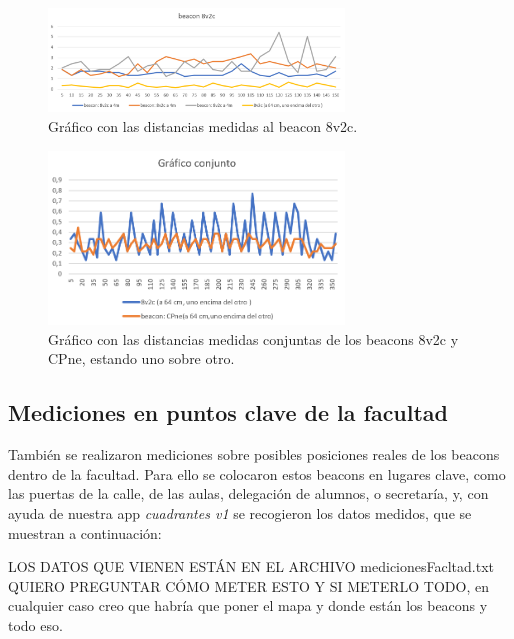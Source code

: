 \begin{figure}[t]
	\centering
	\includegraphics[width=0.7\textwidth]{Imagenes/Descripciondeltrabajo/dist_8v2c}
	\caption{Gráfico con las distancias medidas al beacon 8v2c. }
	\label{fig:dist_8v2c}
\end{figure}

\begin{figure}[t]
	\centering
	\includegraphics[width=0.7\textwidth]{Imagenes/Descripciondeltrabajo/dist_conjunto}
	\caption{Gráfico con las distancias medidas conjuntas de los beacons 8v2c y CPne, estando uno sobre otro. }
	\label{fig:dist_conjunto}
\end{figure}


\subsection{Mediciones en puntos clave de la facultad}

También se realizaron mediciones sobre posibles posiciones reales de los beacons dentro de la facultad. Para ello se colocaron estos beacons en lugares clave, como las puertas de la calle, de las aulas, delegación de alumnos, o secretaría, y, con ayuda de nuestra app \textit{cuadrantes v1} se recogieron los datos medidos, que se muestran a continuación: 

LOS DATOS QUE VIENEN ESTÁN EN EL ARCHIVO medicionesFacltad.txt QUIERO PREGUNTAR CÓMO METER ESTO Y SI METERLO TODO, en cualquier caso creo que habría que poner el mapa y donde están los beacons y todo eso.
